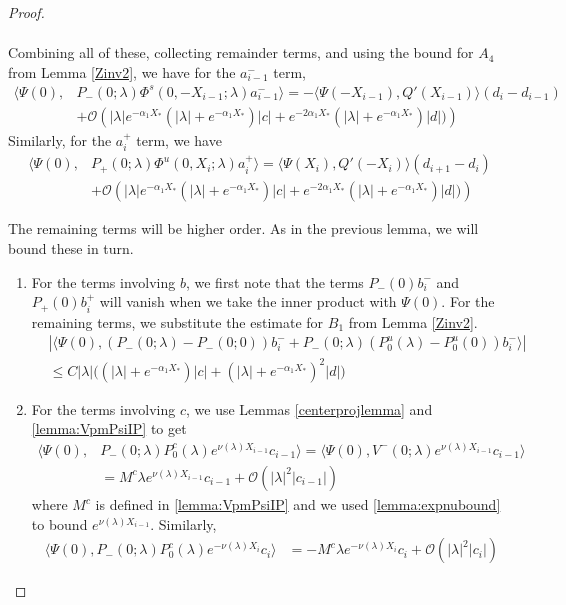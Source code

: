 \documentclass[thesis.tex]{subfiles}
\begin{document}
\begin{lemma}
\begin{proof}
\begin{enumerate}
\begin{align*}
\end{align*}
Combining all of these, collecting remainder terms, and using the bound for $A_4$ from Lemma \ref{Zinv2}, we have for the $a_{i-1}^-$ term,
\begin{align*}
\langle \Psi(0), &P_-(0; \lambda) \Phi^s(0, -X_{i-1}; \lambda) a_{i-1}^- \rangle = -\langle \Psi(-X_{i-1}), Q'(X_{i-1}) \rangle (d_i - d_{i-1} ) \\
&+ \mathcal{O} \left( |\lambda|e^{-\alpha_1 X_*}(|\lambda| + e^{-\alpha_1 X_*})|c| + e^{-2 \alpha_1 X_*} (|\lambda| + e^{-\alpha_1 X_*}) |d| ) \right)
\end{align*}
Similarly, for the $a_i^+$ term, we have
\begin{align*}
\langle \Psi(0), &P_+(0; \lambda) \Phi^u(0, X_i; \lambda) a_i^+ \rangle = \langle \Psi(X_i), Q'(-X_i) \rangle (d_{i+1} - d_i ) \\
&+ \mathcal{O} \left( |\lambda|e^{-\alpha_1 X_*}(|\lambda| + e^{-\alpha_1 X_*})|c| + e^{-2 \alpha_1 X_*} (|\lambda| + e^{-\alpha_1 X_*}) |d| ) \right)
\end{align*}
\end{enumerate}

The remaining terms will be higher order. As in the previous lemma, we will bound these in turn.

\begin{enumerate}

\item For the terms involving $b$, we first note that the terms $P_-(0) b_i^-$ and $P_+(0)b_i^+$ will vanish when we take the inner product with $\Psi(0)$. For the remaining terms, we substitute the estimate for $B_1$ from Lemma \ref{Zinv2}.
\begin{align*}
&|\langle \Psi(0), (P_-(0; \lambda) - P_-(0; 0))b_i^- + P_-(0; \lambda)(P_0^u(\lambda) - P_0^u(0))b_i^- \rangle | \\
&\leq C |\lambda| \Big( (|\lambda| + e^{-\alpha_1 X_*})|c| + (|\lambda| + e^{-\alpha_1 X_*})^2 |d| \Big)
\end{align*}

\item For the terms involving $c$, we use Lemmas \ref{centerprojlemma} and \ref{lemma:VpmPsiIP} to get
\begin{align*}
\langle \Psi(0), &P_-(0; \lambda) P_0^c(\lambda) e^{\nu(\lambda) X_{i-1}} c_{i-1} \rangle = \langle \Psi(0), V^-(0; \lambda) e^{\nu(\lambda) X_{i-1}} c_{i-1} \rangle  \\
&= M^c \lambda e^{\nu(\lambda) X_{i-1}} c_{i-1} + \mathcal{O}(|\lambda|^2 |c_{i-1}|)
\end{align*}
where $M^c$ is defined in \cref{lemma:VpmPsiIP} and we used \cref{lemma:expnubound} to bound $e^{\nu(\lambda) X_{i-1}}$. Similarly, 
\begin{align*}
\langle \Psi(0), P_-(0; \lambda) P_0^c(\lambda) e^{-\nu(\lambda) X_i} c_i \rangle 
&= -M^c \lambda e^{-\nu(\lambda) X_i} c_i + \mathcal{O}(|\lambda|^2|c_i|)
\end{align*}


\end{enumerate}
\end{proof}
\end{lemma}
\end{document}
